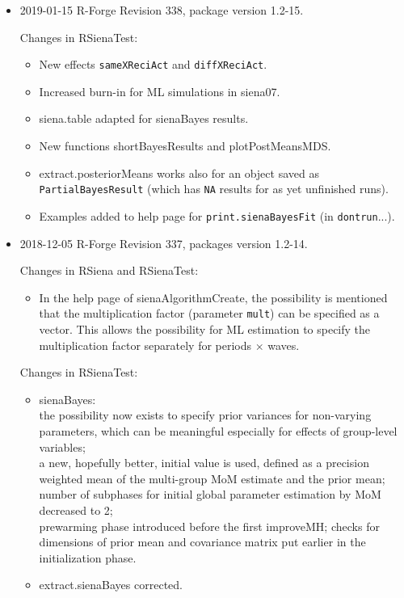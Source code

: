 \documentclass[a4paper,fleqn,11pt]{article}
\newcommand{\+}{\, + \,}
\newcommand{\sfn}[1]{\textsf{#1}}
\begin{document}
\begin{small}
\begin{itemize}
\begin{itemize}
\end{itemize}


\item 2019-01-15 R-Forge Revision 338, package version 1.2-15.

Changes in RSienaTest:
\begin{itemize}
    \item New effects \texttt{sameXReciAct} and \texttt{diffXReciAct}.
    \item Increased burn-in for ML simulations in \sfn{siena07}.
    \item \sfn{siena.table} adapted for \textsf{sienaBayes} results.
   \item  New functions \sfn{shortBayesResults} and \sfn{plotPostMeansMDS}.
   \item  \sfn{extract.posteriorMeans} works also for an object saved as \texttt{PartialBayesResult}
     (which has \texttt{NA} results for as yet unfinished runs).
   \item  Examples added to help page for \texttt{print.sienaBayesFit}
   (in \texttt{dontrun}...).
\end{itemize}

\item 2018-12-05 R-Forge Revision 337, packages version 1.2-14.

Changes in RSiena and RSienaTest:
\begin{itemize}
   \item In the help page of \sfn{sienaAlgorithmCreate}, the possibility is
   mentioned that the multiplication factor (parameter \texttt{mult}) can
   be specified as a vector.
   This allows the possibility for ML estimation to specify the
   multiplication factor separately for periods $\times$ waves.
\end{itemize}

Changes in RSienaTest:
\begin{itemize}
   \item \textsf{sienaBayes}:\\
     the possibility now exists to specify prior variances for non-varying
     parameters, which can be meaningful especially for effects of
     group-level variables;\\
     a new, hopefully better, initial value is used, defined as
     a precision weighted mean of the multi-group MoM estimate and the
     prior mean;\\
     number of subphases for initial global parameter estimation by MoM decreased
     to 2;\\
     prewarming phase introduced before the first \textsf{improveMH};
     checks for dimensions of prior mean and covariance matrix
     put earlier in the initialization phase.
   \item \textsf{extract.sienaBayes} corrected.
\end{itemize}


\end{itemize}
\end{small}
\end{document}
